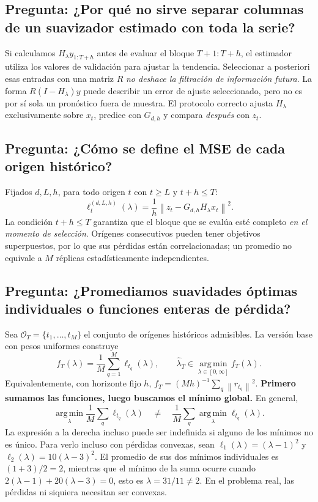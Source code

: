 \documentclass[11pt,letterpaper,parskip=half,headings=small]{scrartcl}
\theoremstyle{definition}\newtheorem{definicion}[proposicion]{Definición}
\theoremstyle{remark}\newtheorem{observacion}[proposicion]{Observación}
\newcommand{\argmin}{\operatorname*{arg\,min}}\newcommand{\diag}{\operatorname{diag}}
\newcommand{\norm}[1]{\left\lVert#1\right\rVert}\newcommand{\inner}[2]{\left\langle#1,#2\right\rangle}
\newcommand{\pregunta}[1]{\subsection{Pregunta: #1}}
\begin{document}
\pregunta{¿Por qué no sirve separar columnas de un suavizador estimado con toda la serie?}
Si calculamos $H_\lambda y_{1:T+h}$ antes de evaluar el bloque $T+1:T+h$, el estimador utiliza los valores de validación para ajustar la tendencia. Seleccionar a posteriori esas entradas con una matriz $R$ \emph{no deshace la filtración de información futura}. La forma $R(I-H_\lambda)y$ puede describir un error de ajuste seleccionado, pero no es por sí sola un pronóstico fuera de muestra. El protocolo correcto ajusta $H_\lambda$ exclusivamente sobre $x_t$, predice con $G_{d,h}$ y compara \emph{después} con $z_t$.

\pregunta{¿Cómo se define el MSE de cada origen histórico?}
Fijados $d,L,h$, para todo origen $t$ con $t\geq L$ y $t+h\leq T$:
\begin{equation}\label{eq:originloss}
\boxed{\ell_t^{(d,L,h)}(\lambda)=\frac1h\norm{z_t-G_{d,h}H_\lambda x_t}^2.}
\end{equation}
La condición $t+h\leq T$ garantiza que el bloque que se evalúa esté completo \emph{en el momento de selección}. Orígenes consecutivos pueden tener objetivos superpuestos, por lo que sus pérdidas están correlacionadas; un promedio no equivale a $M$ réplicas estadísticamente independientes.

\pregunta{¿Promediamos suavidades óptimas individuales o funciones enteras de pérdida?}
Sea $\mathcal O_T=\{t_1,\ldots,t_M\}$ el conjunto de orígenes históricos admisibles. La versión base con pesos uniformes construye
\begin{equation}\label{eq:uniform}
f_T(\lambda)=\frac1M\sum_{q=1}^M\ell_{t_q}(\lambda),\qquad
\widehat\lambda_T\in\argmin_{\lambda\in[0,\infty]}f_T(\lambda).
\end{equation}
Equivalentemente, con horizonte fijo $h$, $f_T=(Mh)^{-1}\sum_q\norm{r_{t_q}}^2$. \textbf{Primero sumamos las funciones, luego buscamos el mínimo global.} En general,
\[
\argmin_\lambda\frac1M\sum_q\ell_{t_q}(\lambda)
\quad\neq\quad\frac1M\sum_q\argmin_\lambda\ell_{t_q}(\lambda).
\]
La expresión a la derecha incluso puede ser indefinida si alguno de los mínimos no es único. Para verlo incluso con pérdidas convexas, sean $\ell_1(\lambda)=(\lambda-1)^2$ y $\ell_2(\lambda)=10(\lambda-3)^2$. El promedio de sus dos mínimos individuales es $(1+3)/2=2$, mientras que el mínimo de la suma ocurre cuando
$2(\lambda-1)+20(\lambda-3)=0$, esto es $\lambda=31/11\neq2$. En el problema real, las pérdidas ni siquiera necesitan ser convexas.
\end{document}
